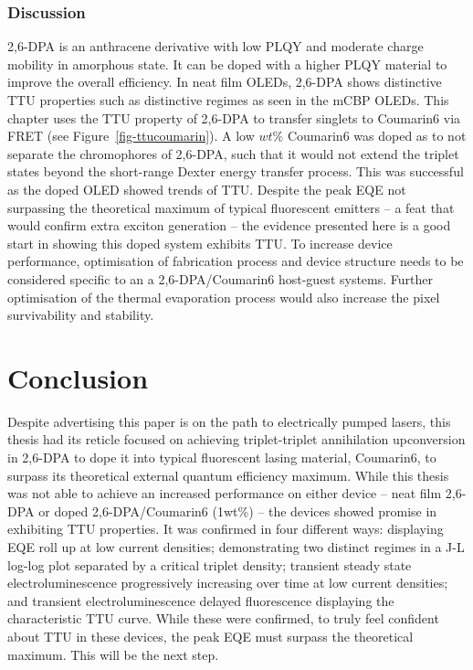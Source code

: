 \documentclass[
  letterpaper,
  DIV=11,
  numbers=noendperiod,
  oneside]{scrreprt}
\begin{document}
\hypertarget{discussion-1}{%
\subsection{Discussion}\label{discussion-1}}

2,6-DPA is an anthracene derivative with low PLQY and moderate charge
mobility in amorphous state. It can be doped with a higher PLQY material
to improve the overall efficiency. In neat film OLEDs, 2,6-DPA shows
distinctive TTU properties such as distinctive regimes as seen in the
mCBP OLEDs. This chapter uses the TTU property of 2,6-DPA to transfer
singlets to Coumarin6 via FRET (see Figure~\ref{fig-ttucoumarin}). A low
\(wt\%\) Coumarin6 was doped as to not separate the chromophores of
2,6-DPA, such that it would not extend the triplet states beyond the
short-range Dexter energy transfer process. This was successful as the
doped OLED showed trends of TTU. Despite the peak EQE not surpassing the
theoretical maximum of typical fluorescent emitters -- a feat that would
confirm extra exciton generation -- the evidence presented here is a
good start in showing this doped system exhibits TTU. To increase device
performance, optimisation of fabrication process and device structure
needs to be considered specific to an a 2,6-DPA/Coumarin6 host-guest
systems. Further optimisation of the thermal evaporation process would
also increase the pixel survivability and stability.


\hypertarget{conclusion}{%
\chapter{Conclusion}\label{conclusion}}

Despite advertising this paper is on the path to electrically pumped
lasers, this thesis had its reticle focused on achieving triplet-triplet
annihilation upconversion in 2,6-DPA to dope it into typical fluorescent
lasing material, Coumarin6, to surpass its theoretical external quantum
efficiency maximum. While this thesis was not able to achieve an
increased performance on either device -- neat film 2,6-DPA or doped
2,6-DPA/Coumarin6 (1wt\%) -- the devices showed promise in exhibiting
TTU properties. It was confirmed in four different ways: displaying EQE
roll up at low current densities; demonstrating two distinct regimes in
a J-L log-log plot separated by a critical triplet density; transient
steady state electroluminescence progressively increasing over time at
low current densities; and transient electroluminescence delayed
fluorescence displaying the characteristic TTU curve. While these were
confirmed, to truly feel confident about TTU in these devices, the peak
EQE must surpass the theoretical maximum. This will be the next step.
\end{document}

